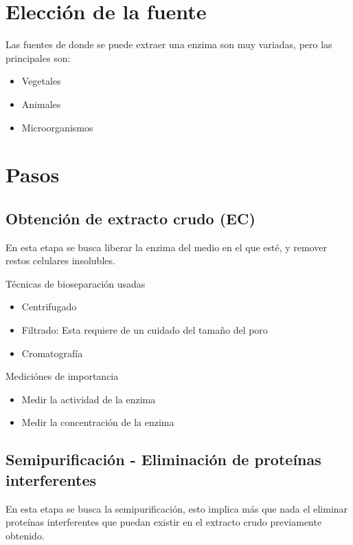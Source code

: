 \section{Elección de la fuente}

Las fuentes de donde se puede extraer una enzima son muy variadas, pero las principales son:

\begin{itemize}
    \item Vegetales
    \item Animales
    \item Microorganismos
\end{itemize}

\section{Pasos}

\subsection{Obtención de extracto crudo (EC)}
 
En esta etapa se busca liberar la enzima del medio en el que esté, y remover restos celulares insolubles.

Técnicas de bioseparación usadas

\begin{itemize}
    \item Centrifugado
    \item Filtrado: Esta requiere de un cuidado del tamaño del poro
    \item Cromatografía
\end{itemize}

Mediciónes de importancia

\begin{itemize}
    \item Medir la actividad de la enzima
    \item Medir la concentración de la enzima
\end{itemize}

\subsection{Semipurificación - Eliminación de proteínas interferentes}

En esta etapa se busca la semipurificación, esto implica más que nada el eliminar proteínas interferentes que puedan existir en el extracto crudo previamente obtenido.

